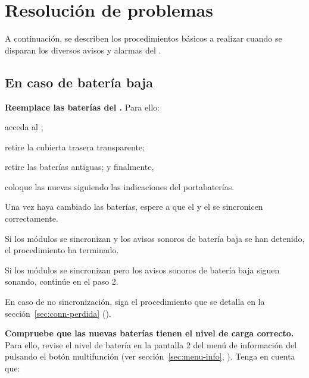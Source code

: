 \section{Resolución de problemas}
\label{sec:resolucion-problemas}

A continuación, se describen los procedimientos básicos a realizar cuando se disparan los diversos avisos y alarmas del \MEE.

\subsection{En caso de batería baja}
\label{sec:bateria-baja}

\begin{enumeratecompact}

\item \textbf{Reemplace las baterías del \MEE.} Para ello:

\begin{itemizecompact}

\item acceda al \MEE; 
\item retire la cubierta trasera transparente;
\item retire las baterías antiguas; y finalmente,
\item coloque las nuevas siguiendo las indicaciones del portabaterías. 

\end{itemizecompact}

Una vez haya cambiado las baterías, espere a que el \MIE y el \MEE se sincronicen correctamente.  

\begin{itemizecompact}

\item Si los módulos se sincronizan y los avisos sonoros de batería baja se han detenido, el procedimiento ha terminado.

\item Si los módulos se sincronizan pero los avisos sonoros de batería baja siguen sonando, continúe en el paso 2.

\item En caso de no sincronización, siga el procedimiento que se detalla en la sección~\ref{sec:conn-perdida} (\textit{}).

\end{itemizecompact}

\item \textbf{Compruebe que las nuevas baterías tienen el nivel de carga correcto.} Para ello, revise el nivel de batería en la pantalla 2 del menú de información del \MIE pulsando el botón multifunción  (ver sección~\ref{sec:menu-info}, \textit{}). Tenga en cuenta que:


\end{enumeratecompact}
